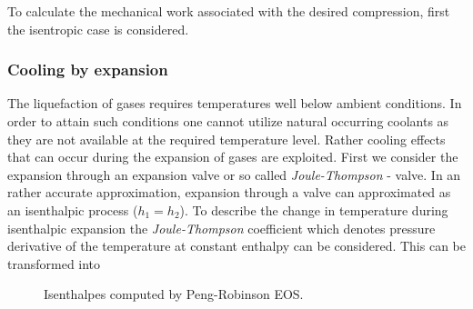     	To calculate the mechanical work associated with the desired compression,
        first the isentropic case
        is considered.

        

    \subsubsection{Cooling by expansion}
        The liquefaction of gases requires temperatures well below ambient conditions. In order to attain
        such conditions one cannot utilize natural occurring coolants as they are not available at the required 
        temperature level. Rather cooling effects that can occur during the expansion of gases are exploited. 
        First we consider the expansion through an expansion valve or so called \emph{Joule-Thompson} - valve. 
        In an rather accurate approximation, expansion through a valve can approximated as an isenthalpic 
        process ($h_1 = h_2$). To describe the change in temperature during isenthalpic expansion 
        the \emph{Joule-Thompson} coefficient
        which denotes pressure derivative of the temperature at constant enthalpy can be considered.
        This can be transformed into


        \begin{figure}
            \center
            
            \caption{Isenthalpes computed by Peng-Robinson EOS.}
            \label{fig:pr_isenthalpes}
        \end{figure}


